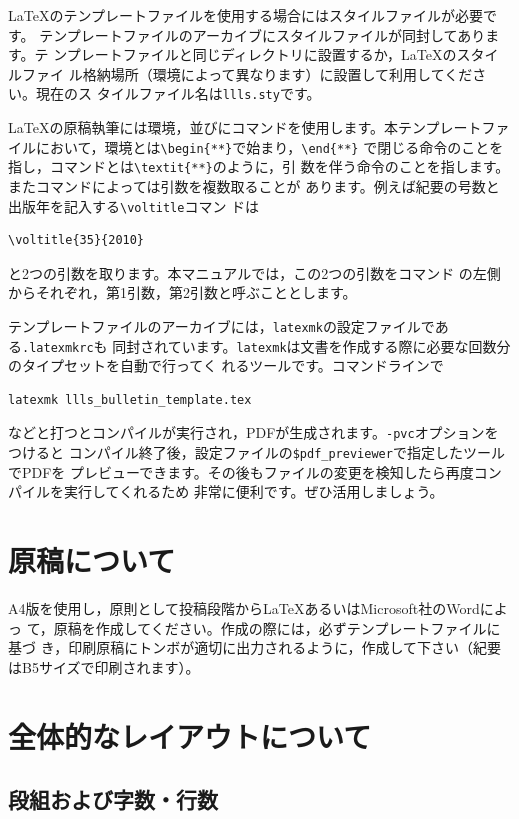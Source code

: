 \documentclass[b5paper,10pt,twocolumn,tombow]{jarticle}
\begin{document}
\LaTeX{}のテンプレートファイルを使用する場合にはスタイルファイルが必要です。
テンプレートファイルのアーカイブにスタイルファイルが同封してあります。テ
ンプレートファイルと同じディレクトリに設置するか，\LaTeX{}のスタイルファイ
ル格納場所（環境によって異なります）に設置して利用してください。現在のス
タイルファイル名は\texttt{llls.sty}です。

\LaTeX{}の原稿執筆には環境，並びにコマンドを使用します。本テンプレートファ
イルにおいて，環境とは\verb|\begin{**}|で始まり，\verb|\end{**}|
で閉じる命令のことを指し，コマンドとは\verb|\textit{**}|のように，引
数を伴う命令のことを指します。またコマンドによっては引数を複数取ることが
あります。例えば紀要の号数と出版年を記入する\verb|\voltitle|コマン
ドは
\begin{verbatim}
\voltitle{35}{2010}
\end{verbatim}
と2つの引数を取ります。本マニュアルでは，この2つの引数をコマンド
の左側からそれぞれ，第1引数，第2引数と呼ぶこととします。

テンプレートファイルのアーカイブには，\texttt{latexmk}の設定ファイルである\texttt{.latexmkrc}も
同封されています。\texttt{latexmk}は文書を作成する際に必要な回数分のタイプセットを自動で行ってく
れるツールです。コマンドラインで
\begin{verbatim}
latexmk llls_bulletin_template.tex
\end{verbatim}
などと打つとコンパイルが実行され，PDFが生成されます。\verb|-pvc|オプションをつけると
コンパイル終了後，設定ファイルの\verb|$pdf_previewer|で指定したツールでPDFを
プレビューできます。その後もファイルの変更を検知したら再度コンパイルを実行してくれるため
非常に便利です。ぜひ活用しましょう。

\section{原稿について}
A4版を使用し，原則として投稿段階から\LaTeX{}あるいはMicrosoft社のWordによっ
て，原稿を作成してください。作成の際には，必ずテンプレートファイルに基づ
き，印刷原稿にトンボが適切に出力されるように，作成して下さい（紀要
はB5サイズで印刷されます）。

\section{全体的なレイアウトについて}
\subsection{段組および字数・行数}
\end{document}
